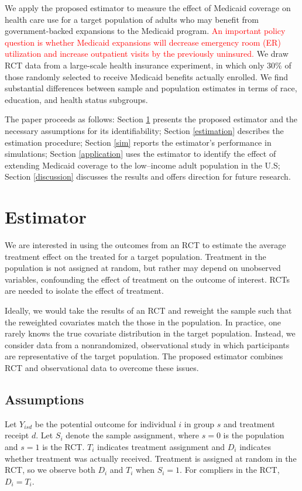\documentclass[hidelinks,12pt]{article}
\begin{document}
We apply the proposed estimator to measure the effect of Medicaid coverage on health care use for a target population of adults who may benefit from government-backed expansions to the Medicaid program. \textcolor{red}{An important policy question is whether Medicaid expansions will decrease emergency room (ER) utilization and increase outpatient visits by the previously uninsured.} We draw RCT data from a large-scale health insurance experiment, in which only $30\%$ of those randomly selected to receive Medicaid benefits actually enrolled. We find substantial differences between sample and population estimates in terms of race, education, and health status subgroups.

The paper proceeds as follows: Section \ref{estimator} presents the proposed estimator and the necessary assumptions for its identifiability; Section \ref{estimation} describes the estimation procedure; Section \ref{sim} reports the estimator's performance in simulations; Section \ref{application} uses the estimator to identify the effect of extending Medicaid coverage to the low--income adult population in the U.S; Section \ref{discussion} discusses the results and offers direction for future research. 

\section{Estimator} \label{estimator}
We are interested in using the outcomes from an RCT to estimate the average treatment effect on the treated for a target population. Treatment in the population is not assigned at random, but rather may depend on unobserved variables, confounding the effect of treatment on the outcome of interest. RCTs are needed to isolate the effect of treatment. 

Ideally, we would take the results of an RCT and reweight the sample such that the reweighted covariates match the those in the population. In practice, one rarely knows the true covariate distribution in the target population. Instead, we consider data from a nonrandomized, observational study in which participants are representative of the target population. The proposed estimator combines RCT and observational data to overcome these issues.

\subsection{Assumptions} \label{assumptions}
Let $Y_{isd}$ be the potential outcome for individual $i$ in group $s$ and treatment receipt $d$. Let $S_i$ denote the sample assignment, where $s=0$ is the population and $s=1$ is the RCT. $T_i$ indicates treatment assignment and $D_i$ indicates whether treatment was actually received. Treatment is assigned at random in the RCT, so we observe both $D_i$ and $T_i$ when $S_i = 1$. For compliers in the RCT, $D_i = T_i$.
\end{document}
